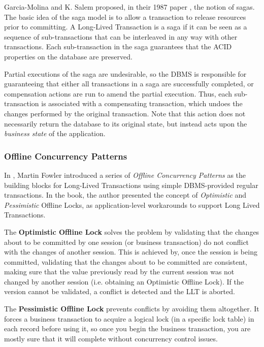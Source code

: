 \documentclass{llncs}
\begin{document}
Garcia-Molina and K. Salem proposed, in their 1987 paper
\cite{garcia1987sagas}, the notion of sagas. The basic idea of the
saga model is to allow a transaction to release resources prior to
committing. A Long-Lived Transaction is a saga if it can be seen as a
sequence of sub-transactions that can be interleaved in any way with
other transactions. Each sub-transaction in the saga guarantees that
the ACID properties on the database are preserved.

Partial executions of the saga are undesirable, so the DBMS is
responsible for guaranteeing that either all transactions in a saga
are successfully completed, or compensation actions are run to amend
the partial execution. Thus, each sub-transaction is associated with a
compensating transaction, which undoes the changes performed by the
original transaction. Note that this action does not necessarily
return the database to its original state, but instead acts upon the
{\it business state} of the application.

\subsubsection{Offline Concurrency Patterns}

In \cite{fowler2003patterns}, Martin Fowler introduced a series of
{\it Offline Concurrency Patterns} as the building blocks for
Long-Lived Transactions using simple DBMS-provided regular
transactions. In the book, the author presented the concept of {\it
  Optimistic} and {\it Pessimistic} Offline Locks, as
application-level workarounds to support Long Lived Transactions.

The {\bf Optimistic Offline Lock} solves the problem by validating
that the changes about to be committed by one session (or business
transaction) do not conflict with the changes of another session. This
is achieved by, once the session is being committed, validating that
the changes about to be committed are consistent, making sure that the
value previously read by the current session was not changed by
another session (i.e. obtaining an Optimistic Offline Lock). If the
version cannot be validated, a conflict is detected and the LLT is aborted.

The {\bf Pessimistic Offline Lock} prevents conflicts by avoiding them
altogether. It forces a business transaction to acquire a logical lock
(in a specific lock table) in each record before using it, so once you
begin the business transaction, you are mostly sure that it will
complete without concurrency control issues.
\end{document}
